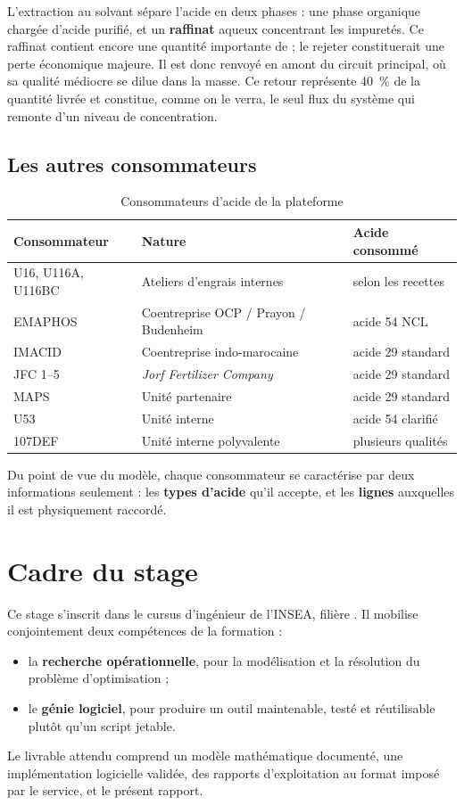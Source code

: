 L'extraction au solvant sépare l'acide en deux phases : une phase organique chargée d'acide
purifié, et un \textbf{raffinat} aqueux concentrant les impuretés. Ce raffinat contient
encore une quantité importante de \PdeuxOcinq{} ; le rejeter constituerait une perte
économique majeure. Il est donc renvoyé en amont du circuit principal, où sa qualité
médiocre se dilue dans la masse. Ce retour représente \SI{40}{\percent} de la quantité
livrée et constitue, comme on le verra, le seul flux du système qui remonte d'un niveau de
concentration.

\subsection{Les autres consommateurs}

\begin{table}[H]
\centering
\caption{Consommateurs d'acide de la plateforme}
\label{tab:consommateurs}
\begin{tabular}{@{}lll@{}}
\toprule
\textbf{Consommateur} & \textbf{Nature} & \textbf{Acide consommé} \\
\midrule
U16, U116A, U116BC & Ateliers d'engrais internes & selon les recettes \\
EMAPHOS & Coentreprise OCP / Prayon / Budenheim & acide 54 NCL \\
IMACID & Coentreprise indo-marocaine & acide 29 standard \\
JFC 1--5 & \emph{Jorf Fertilizer Company} & acide 29 standard \\
MAPS & Unité partenaire & acide 29 standard \\
U53 & Unité interne & acide 54 clarifié \\
107DEF & Unité interne polyvalente & plusieurs qualités \\
\bottomrule
\end{tabular}
\end{table}

Du point de vue du modèle, chaque consommateur se caractérise par deux informations
seulement : les \textbf{types d'acide} qu'il accepte, et les \textbf{lignes} auxquelles il
est physiquement raccordé.

\section{Cadre du stage}

Ce stage s'inscrit dans le cursus d'ingénieur de l'INSEA, filière \filiere. Il mobilise
conjointement deux compétences de la formation :

\begin{itemize}
  \item la \textbf{recherche opérationnelle}, pour la modélisation et la résolution du
        problème d'optimisation ;
  \item le \textbf{génie logiciel}, pour produire un outil maintenable, testé et
        réutilisable plutôt qu'un script jetable.
\end{itemize}

Le livrable attendu comprend un modèle mathématique documenté, une implémentation
logicielle validée, des rapports d'exploitation au format imposé par le service, et le
présent rapport.
